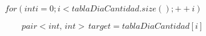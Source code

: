 
\begin{algorithmic}[1]
	
	\Statex
		
	\State$for (int i = 0; i < tablaDiaCantidad.size(); ++i)$

		\State $ \: \: \: \: \: \: \: \: \:pair <int, \,int> \, target = tablaDiaCantidad[i]$
		
	


	\Statex
	\end{algorithmic}



	
